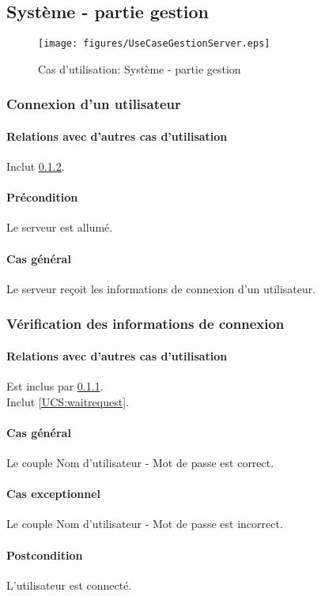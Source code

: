 \subsection{Système - partie gestion}
\begin{figure}[h!]
    \centering
    \texttt{[image: figures/UseCaseGestionServer.eps]}
    \caption{\label{fig:UCS:system} Cas d'utilisation: Système - partie gestion}
\end{figure}

\subsubsection{Connexion d'un utilisateur}
	\label{UCS:connection}
	\paragraph{Relations avec d'autres cas d'utilisation} Inclut \ref{UCS:verification}.
    \paragraph{Précondition} Le \gls{serveur} est allumé.
    \paragraph{Cas général} Le serveur reçoit les informations de connexion d'un utilisateur.


\subsubsection{Vérification des informations de connexion}
	\label{UCS:verification}
	\paragraph{Relations avec d'autres cas d'utilisation} Est inclus par \ref{UCS:connection}.\\
	Inclut \ref{UCS:waitrequest}.
    \paragraph{Cas général} Le couple Nom d'utilisateur - Mot de passe est correct.
    \paragraph{Cas exceptionnel} Le couple Nom d'utilisateur - Mot de passe est incorrect.
    \paragraph{Postcondition} L'utilisateur est connecté.
    

